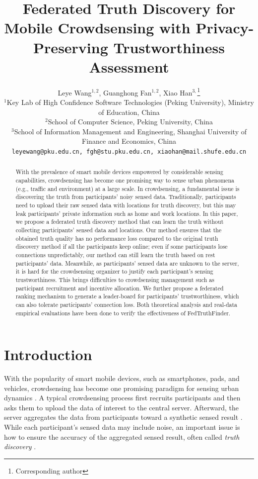 \documentclass[11pt]{article}
\title{Federated Truth Discovery for Mobile Crowdsensing with Privacy-Preserving Trustworthiness Assessment}
\author{Leye Wang$^{1,2}$, Guanghong Fan$^{1,2}$, Xiao Han$^{3,}$\footnote{Corresponding author} \\
 \small $^1$Key Lab of High Confidence Software Technologies (Peking University), Ministry of Education, China \\
\small$^2$School of Computer Science, Peking University, China\\
\small$^3$School of Information Management and Engineering, Shanghai University of Finance and Economics, China\\
\texttt{\small leyewang@pku.edu.cn, fgh@stu.pku.edu.cn, xiaohan@mail.shufe.edu.cn}
}
\begin{document}
	
\maketitle

\begin{abstract}
With the prevalence of smart mobile devices empowered by considerable sensing capabilities, crowdsensing has become one promising way to sense urban phenomena (e.g., traffic and environment) at a large scale. In crowdsensing, a fundamental issue is discovering the truth from participants' noisy sensed data. Traditionally, participants need to upload their raw sensed data with locations for truth discovery, but this may leak participants' private information such as home and work locations. In this paper, we propose a federated truth discovery method that can learn the truth without collecting participants' sensed data and locations. Our method ensures that the obtained truth quality has no performance loss compared to the original truth discovery method if all the participants keep online; even if some participants lose connections unpredictably, our method can still learn the truth based on rest participants' data.
Meanwhile, as participants' sensed data are unknown to the server, it is hard for the crowdsensing organizer to justify each participant's sensing trustworthiness. This brings difficulties to crowdsensing management such as participant recruitment and incentive allocation. We further propose a federated ranking mechanism to generate a leader-board for participants' trustworthiness, which can also tolerate participants' connection loss. Both theoretical analysis and real-data empirical evaluations have been done to verify the effectiveness of FedTruthFinder.

\end{abstract}

\section{Introduction}

With the popularity of smart mobile devices, such as smartphones, pads, and vehicles, crowdsensing has become one promising paradigm for sensing urban dynamics \cite{Leye-ganti2011mobile}. A typical crowdsensing process first recruits participants and then asks them to upload the data of interest to the central server. Afterward, the server aggregates the data from participants toward a synthetic sensed result \cite{Leye-zhang20144w1h,Leye-ma2014opportunities}. While each participant's sensed data may include noise, an important issue is how to ensure the accuracy of the aggregated sensed result, often called \textit{truth discovery} \cite{Leye-wang2012truth,Leye-meng2015truth,Leye-Wang2014SurrogateMS}.
\end{document}
